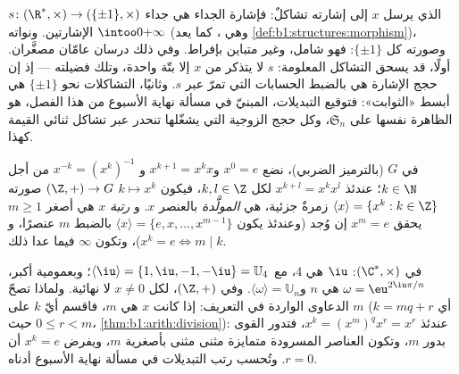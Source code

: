 \begin{example}\label{ex:b1:structures:signmorphism}
 $s \colon (\R^*, \times) \to (\{\pm1\}, \times)$ الذي يرسل
$x$ إلى إشارته تشاكلٌ: فإشارة الجداء هي
جداء الإشارتين. ونواته $\intoo0{+\infty}$ (وهي
، كما يعد \cref{def:b1:structures:morphism})، وصورته
كل $\{\pm1\}$: فهو شامل، وغير متباين بإفراط.
وفي ذلك درسان عامّان مصغَّران. أولًا، قد يسحق التشاكل المعلومة:  $s$ لا يتذكر من $x$ إلا بتّة واحدة، وتلك
فضيلته --- إذ إن حجج الإشارة هي بالضبط الحسابات
التي تمرّ عبر $s$. وثانيًا، التشاكلات نحو $\{\pm1\}$ هي
أبسط «الثوابت»: فتوقيع التبديلات، المبنيّ في
مسألة نهاية الأسبوع من هذا الفصل، هو الظاهرة نفسها على
 $\mathfrak S_n$، وكل حجج الزوجية التي يشغّلها
تنحدر عبر تشاكل ثنائي القيمة كهذا.
\end{example}

\begin{definition}\label{def:b1:structures:order}
في  $G$ (بالترميز الضربي)، نضع $x^0 = e$ و$x^{k+1} =
x^k x$ و $x^{-k} = (x^k)^{-1}$ من أجل $k \in \N$؛ عندئذ $x^{k+l} = x^k
x^l$ لكل $k, l \in \Z$، فيكون $k \mapsto x^k$  $(\Z,
+) \to G$ صورته $\langle x \rangle = \{x^k : k \in \Z\}$ زمرةٌ
جزئية، هي  \emph{المولَّدة} بالعنصر $x$. و
\emph{رتبة} $x$ هي أصغر $m \geq
1$ يحقق $x^m = e$ إن وُجد (وعندئذ يكون  $\langle x\rangle = \{e, x,
\dots, x^{m-1}\}$ بالضبط $m$ عنصرًا، و$x^k = e \iff m
\mid k$)، وتكون $\infty$ فيما عدا ذلك.
\end{definition}

\begin{example}\label{ex:b1:structures:order}
في $(\C^*, \times)$:  $\iu$ هي $4$، مع $\langle \iu \rangle
= \{1, \iu, -1, -\iu\} = \mathbb{U}_4$؛ وبعمومية أكبر،  $\omega =
\eu^{2\iu\pi/n}$ هي $n$ و$\langle\omega\rangle =
\mathbb{U}_n$. وفي $(\Z, +)$، لكل $x \neq 0$  لا نهائية.
ولماذا تصحّ الدعاوى الواردة في التعريف: إذا كانت  $x$ هي $m$، فاقسم
أيّ $k$ على $m$ (أي $k = mq + r$ حيث $0 \leq r < m$،
\cref{thm:b1:arith:division}): عندئذ $x^k = (x^m)^q x^r = x^r$، فتدور
القوى بدور $m$، وتكون العناصر المسرودة متمايزة مثنى
مثنى بأصغرية $m$، ويفرض $x^k = e$ أن $r = 0$. وتُحسب رتب
التبديلات في مسألة نهاية الأسبوع أدناه.
\end{example}

